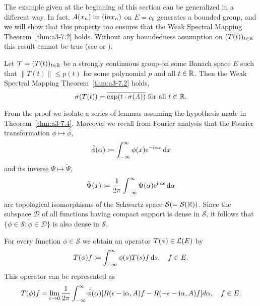 The example given at the beginning of this section can be generalized in a different way.
In fact, $A(x_{n}) \coloneqq (\mathrm{i} nx_{n})$ on $E = c_{0}$ generates a bounded group, and we will show that this property too ensures that the Weak Spectral Mapping Theorem~\ref{thm:a3-7.2} holds.
Without any boundedness assumption on $(T(t))_{t\in\mathbb{R}}$ this result cannot be true (see \citet[Sec.23.16]{hillephillips:1957} or \citet{wolff:1981}).
\begin{theorem}\label{thm:a3-7.4}
Let $\mathcal{T} = (T(t))_{t\in\mathbb{R}}$ be a strongly continuous group on some Banach space $E$ such that $\|T(t)\| \leq p(t)$ for some polynomial $p$ and all $t \in \mathbb{R}$.
Then the Weak Spectral Mapping Theorem~\ref{thm:a3-7.2} holds, \ie 
\[
\sigma(T(t)) = \overline{\exp(t\cdot\sigma(A))} \text{ for all } t \in \mathbb{R} .
\]
\end{theorem}
From the proof we isolate a series of lemmas assuming the hypothesis made in Theorem~\ref{thm:a3-7.4}.
Moreover we recall from Fourier analysis that the Fourier transformation $\phi \mapsto \hat{\phi}$,
\[
\hat{\phi}(\alpha) \coloneqq \int_{-\infty}^{\infty} \phi(x)\mathrm{e}^{-\mathrm{i}\alpha x} \mathop{}\!\mathrm{d}{x}
\]
and its inverse $\Psi \mapsto \check{\Psi}$,
\[
\check{\Psi}(x) \coloneqq \frac{1}{2\pi}\int_{-\infty}^{\infty}\Psi(\alpha)\mathrm{e}^{\mathrm{i}\alpha x} 				\mathop{}\!\mathrm{d}{\alpha}
\]
are topological isomorphisms of the Schwartz space $\mathcal{S} ( = \mathcal{S}(\mathbb{R}))$.
Since the subspace $\mathcal{D}$ of all functions having compact support is dense in $\mathcal{S}$, it follows that $\{\phi \in \mathcal{S} \colon \check{\phi} \in \mathcal{D}\}$ is also dense in $\mathcal{S}$.
\begin{lemma}\label{lem:a3-7.5}
For every function $\phi \in \mathcal{S}$ we obtain an operator $T(\phi) \in \mathcal{L}(E)$ by
\[
T(\phi)f \coloneqq \int_{-\infty}^{\infty} \phi(s)T(s)f \mathop{}\!\mathrm{d}{s}, \quad f \in E .
\]
This operator can be represented as
\begin{equation}\label{eq:a3-7.3}
T(\phi)f = \lim_{\epsilon\to 0} \frac{1}{2\pi}\int_{-\infty}^{\infty} \check{\phi}(\alpha)[R(\epsilon-\mathrm{i}\alpha,A)f - R(-\epsilon-\mathrm{i}\alpha,A)f] d\alpha, \quad f \in E .
\end{equation}
\end{lemma}

